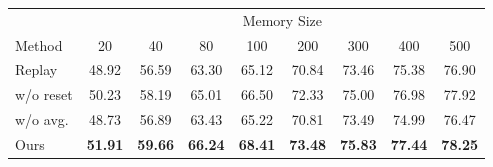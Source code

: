 \centering
\begin{tabular}{l|cccccccc}
\toprule
\multicolumn{1}{l|}{} & \multicolumn{8}{c}{Memory Size} \\
\cmidrule(l){2-9}

Method & 20 & 40 & 80 & 100 & 200 & 300 & 400 & 500 \\
\midrule

Replay & 48.92 & 56.59 & 63.30 & 65.12& 70.84 & 73.46 & 75.38  &  76.90 \\


w/o reset & 50.23 & 58.19 & 65.01 & 66.50 & 72.33 & 75.00 & 76.98 & 77.92\\

w/o avg. & 48.73 & 56.89 & 63.43 & 65.22 & 70.81 & 73.49 & 74.99 & 76.47\\

Ours & \bf{51.91} & \bf{59.66} & \bf{66.24} & \bf{68.41} & \bf{73.48} & \bf{75.83} & \bf{77.44} & \bf{78.25} \\




\bottomrule
\end{tabular}


